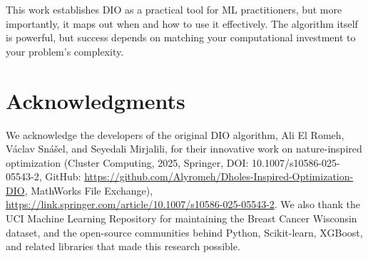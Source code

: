 \documentclass[12pt, a4paper]{article}
\begin{document}
This work establishes DIO as a practical tool for ML practitioners, but more importantly, it maps out when and how to use it effectively. The algorithm itself is powerful, but success depends on matching your computational investment to your problem's complexity.

\section*{Acknowledgments}
We acknowledge the developers of the original DIO algorithm, Ali El Romeh, Václav Snášel, and Seyedali Mirjalili, for their innovative work on nature-inspired optimization (Cluster Computing, 2025, Springer, DOI: 10.1007/s10586-025-05543-2, GitHub: \url{https://github.com/Alyromeh/Dholes-Inspired-Optimization-DIO}, MathWorks File Exchange), \url{https://link.springer.com/article/10.1007/s10586-025-05543-2}. We also thank the UCI Machine Learning Repository for maintaining the Breast Cancer Wisconsin dataset, and the open-source communities behind Python, Scikit-learn, XGBoost, and related libraries that made this research possible.

\end{document}
